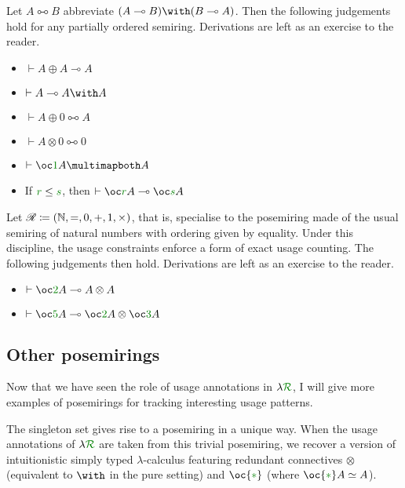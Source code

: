 \begin{example}
  Let $A \multimapboth B$ abbreviate
  $\plr{A \multimap B} \with \plr{B \multimap A}$.
  Then the following judgements hold for any partially ordered semiring.
  Derivations are left as an exercise to the reader.
  \begin{itemize}
    \item $\vdash A \oplus A \multimap A$
    \item $\vdash A \multimap A \with A$
    \item $\vdash A \oplus 0 \multimapboth A$
    \item $\vdash A \otimes 0 \multimapboth 0$
    \item $\vdash \oc\gr1A \multimapboth A$
    \item If $\gr r \leq \gr s$, then $\vdash \oc\gr rA \multimap \oc\gr sA$
  \end{itemize}
\end{example}

\begin{example}
  Let $\mathscr R \coloneqq (\mathbb N, =, 0, +, 1, \times)$, that is, specialise to
  the posemiring made of
  the usual semiring of natural numbers with ordering given by equality.
  Under this discipline, the usage constraints enforce a form of exact usage
  counting.
  The following judgements then hold.
  Derivations are left as an exercise to the reader.
  \begin{itemize}
    \item $\vdash \oc\gr2A \multimap A \otimes A$
    \item $\vdash \oc\gr5A \multimap \oc\gr2A \otimes \oc\gr3A$
  \end{itemize}
\end{example}

\subsection{Other posemirings}\label{sec:example-posemirings}

Now that we have seen the role of usage annotations in $\name$, I will give more
examples of posemirings for tracking interesting usage patterns.

\begin{example}\label{def:trivial-posemiring}
  The singleton set gives rise to a posemiring in a unique way.
  When the usage annotations of $\name$ are taken from this trivial posemiring,
  we recover a version of intuitionistic simply typed $\lambda$-calculus
  featuring redundant connectives $\otimes$ (equivalent to $\with$ in the pure
  setting) and $\oc{\gr*}$ (where $\oc{\gr*} A \simeq A$).
\end{example}

